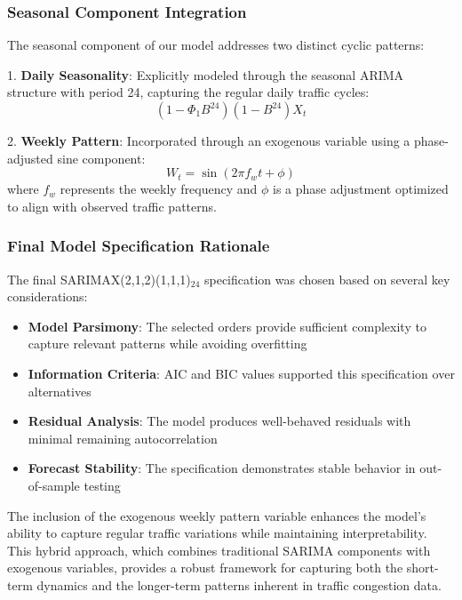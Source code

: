 \documentclass{article}
\begin{document}
\subsubsection{Seasonal Component Integration}
The seasonal component of our model addresses two distinct cyclic patterns:

1. \textbf{Daily Seasonality}: Explicitly modeled through the seasonal ARIMA structure with period 24, capturing the regular daily traffic cycles:
   \begin{equation}
   (1-\Phi_1B^{24})(1-B^{24})X_t
   \end{equation}

2. \textbf{Weekly Pattern}: Incorporated through an exogenous variable using a phase-adjusted sine component:
   \begin{equation}
   W_t = \sin(2\pi f_w t + \phi)
   \end{equation}
   where $f_w$ represents the weekly frequency and $\phi$ is a phase adjustment optimized to align with observed traffic patterns.

\subsubsection{Final Model Specification Rationale}
The final SARIMAX(2,1,2)(1,1,1)$_{24}$ specification was chosen based on several key considerations:

\begin{itemize}
    \item \textbf{Model Parsimony}: The selected orders provide sufficient complexity to capture relevant patterns while avoiding overfitting
    \item \textbf{Information Criteria}: AIC and BIC values supported this specification over alternatives
    \item \textbf{Residual Analysis}: The model produces well-behaved residuals with minimal remaining autocorrelation
    \item \textbf{Forecast Stability}: The specification demonstrates stable behavior in out-of-sample testing
\end{itemize}

The inclusion of the exogenous weekly pattern variable enhances the model's ability to capture regular traffic variations while maintaining interpretability. This hybrid approach, which combines traditional SARIMA components with exogenous variables, provides a robust framework for capturing both the short-term dynamics and the longer-term patterns inherent in traffic congestion data.
\end{document}
